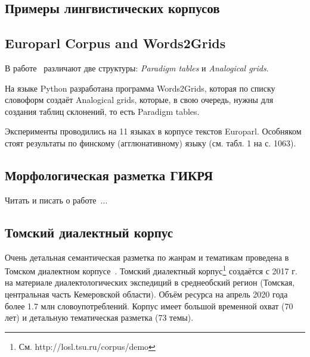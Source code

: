  \subsection{Примеры лингвистических корпусов}

 \subsection{Europarl Corpus and Words2Grids}

В работе~\cite{Fam2018tools} различают две структуры: \emph{Paradigm tables} 
и \emph{Analogical grids}. 

На языке Python разработана программа Words2Grids, которая по списку словоформ 
создаёт Analogical grids, которые, в свою очередь, нужны для создания 
таблиц склонений, то есть Paradigm tables.

Эксперименты проводились на 11 языках в корпусе текстов Europarl. 
Особняком стоят результаты по финскому (агглюнативному) языку (см. табл. 1 на с. 1063).


\subsection{Морфологическая разметка ГИКРЯ}

Читать и писать о работе~\cite{Selegey2016}...

\subsection{Томский диалектный корпус}
Очень детальная семантическая разметка по жанрам и тематикам проведена в Томском диалектном корпусе~\cite{Zemicheva2019}.
Томский  диалектный  корпус\footnote{ См. http://losl.tsu.ru/corpus/demo}  создаётся  с  2017  г.  на  материале  диалектологических  экспедиций  в  среднеобский  регион  (Томская,  центральная  часть  Кемеровской  области).  Объём  ресурса на  апрель 2020 года более 1.7 млн словоупотреблений. Корпус имеет большой временной охват (70 лет) и детальную тематическая разметка (73  темы). 